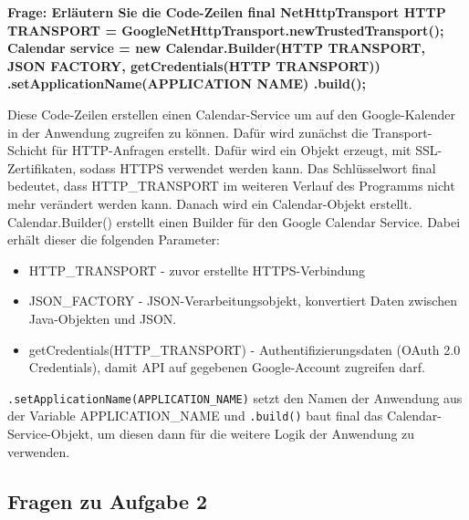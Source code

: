 \documentclass[a4paper]{article}
\newenvironment{frage}[1]{%
	\par\noindent\textbf{Frage: #1}\par
}{\medskip}
\begin{document}
	\begin{frage}{Erläutern Sie die Code-Zeilen final NetHttpTransport HTTP TRANSPORT
			= GoogleNetHttpTransport.newTrustedTransport(); Calendar service
			= new Calendar.Builder(HTTP TRANSPORT, JSON FACTORY, getCredentials(HTTP TRANSPORT))
			.setApplicationName(APPLICATION NAME) .build();}
		Diese Code-Zeilen erstellen einen Calendar-Service um auf den Google-Kalender in der Anwendung zugreifen zu können. Dafür wird zunächst die Transport-Schicht für HTTP-Anfragen erstellt. Dafür wird ein Objekt erzeugt, mit SSL-Zertifikaten, sodass HTTPS verwendet werden kann. Das Schlüsselwort final bedeutet, dass HTTP_TRANSPORT im weiteren Verlauf des Programms nicht mehr verändert werden kann.
		Danach wird ein Calendar-Objekt erstellt. Calendar.Builder() erstellt einen Builder für den Google Calendar Service. Dabei erhält dieser die folgenden Parameter:
		\begin{itemize}
			\item HTTP_TRANSPORT - zuvor erstellte HTTPS-Verbindung
			\item JSON_FACTORY - JSON-Verarbeitungsobjekt, konvertiert Daten zwischen Java-Objekten und JSON.
			\item getCredentials(HTTP_TRANSPORT) - Authentifizierungsdaten (OAuth 2.0 Credentials), damit API auf gegebenen Google-Account zugreifen darf.
		\end{itemize}
		\texttt{.setApplicationName(APPLICATION_NAME)} setzt den Namen der Anwendung aus der Variable APPLICATION_NAME und \texttt{.build()} baut final das Calendar-Service-Objekt, um diesen dann für die weitere Logik der Anwendung zu verwenden.
	\end{frage}
	
	\subsection{Fragen zu Aufgabe 2}
	
\end{document}
